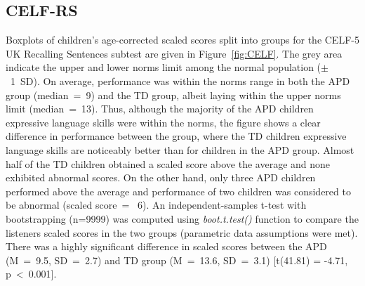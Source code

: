 \documentclass[a4paper, twoside]{templates/ociamthesis}
\begin{document}
\begin{table}

\caption{\label{tab:ENVASA-zTab}ENVASA: Descriptive and statistics of the listeners age-independent standard residuals (z-scores) split by groups and test measures.}
\centering
{}
\end{table}

\hypertarget{celf-rs-1}{%
\subsection{CELF-RS}\label{celf-rs-1}}

Boxplots of children's age-corrected scaled scores split into groups for the CELF-5 UK Recalling Sentences subtest are given in Figure~\ref{fig:CELF}. The grey area indicate the upper and lower norms limit among the normal population (\(\pm\)~1~SD). On average, performance was within the norms range in both the APD group (median~=~9) and the TD group, albeit laying within the upper norms limit (median~=~13). Thus, although the majority of the APD children expressive language skills were within the norms, the figure shows a clear difference in performance between the group, where the TD children expressive language skills are noticeably better than for children in the APD group. Almost half of the TD children obtained a scaled score above the average and none exhibited abnormal scores. On the other hand, only three APD children performed above the average and performance of two children was considered to be abnormal (scaled score~= ~6). An independent-samples t-test with bootstrapping (n=9999) was computed using \emph{boot.t.test()} function \autocite[MKinfer package;][]{MKinferPackageR} to compare the listeners scaled scores in the two groups (parametric data assumptions were met). There was a highly significant difference in scaled scores between the APD (M~=~9.5, SD~=~2.7) and TD group (M~=~13.6, SD~=~3.1) {[}t(41.81) = -4.71, p~\textless~0.001{]}.
\end{document}
